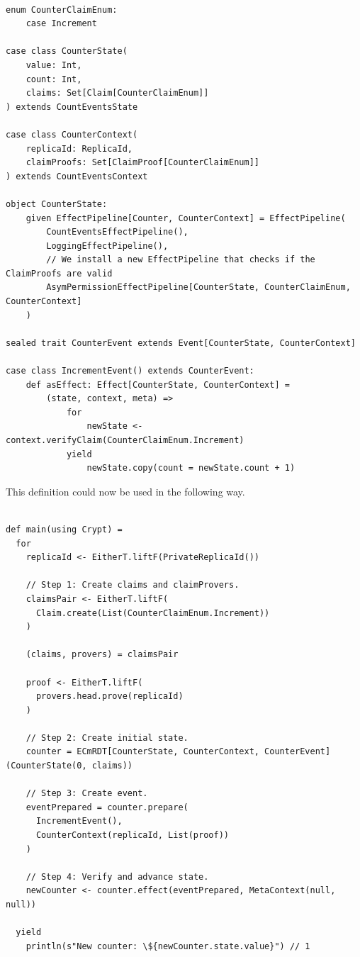 \documentclass[
	ngerman,
	ruledheaders=section,   %
	class=report,		    %
	thesis={type=bachelor}, %
	accentcolor=9c,			%
	custommargins=false,    %
	marginpar=false,        %
	parskip=half-,          %
	fontsize=11pt,          %
]{tudapub}
\begin{document}
\begin{lstlisting}

enum CounterClaimEnum:
	case Increment

case class CounterState(
	value: Int,
	count: Int,
	claims: Set[Claim[CounterClaimEnum]]
) extends CountEventsState

case class CounterContext(
	replicaId: ReplicaId,
	claimProofs: Set[ClaimProof[CounterClaimEnum]]
) extends CountEventsContext

object CounterState:
	given EffectPipeline[Counter, CounterContext] = EffectPipeline(
		CountEventsEffectPipeline(),
		LoggingEffectPipeline(),
		// We install a new EffectPipeline that checks if the ClaimProofs are valid
		AsymPermissionEffectPipeline[CounterState, CounterClaimEnum, CounterContext]
	)

sealed trait CounterEvent extends Event[CounterState, CounterContext]

case class IncrementEvent() extends CounterEvent:
	def asEffect: Effect[CounterState, CounterContext] =
		(state, context, meta) =>
			for
				newState <- context.verifyClaim(CounterClaimEnum.Increment)
			yield
				newState.copy(count = newState.count + 1)

\end{lstlisting}

\newpage

This definition could now be used in the following way.

\begin{lstlisting}

def main(using Crypt) = 
  for
    replicaId <- EitherT.liftF(PrivateReplicaId())

    // Step 1: Create claims and claimProvers.
    claimsPair <- EitherT.liftF(
      Claim.create(List(CounterClaimEnum.Increment))
    )

    (claims, provers) = claimsPair

    proof <- EitherT.liftF(
      provers.head.prove(replicaId)
    )

    // Step 2: Create initial state.
    counter = ECmRDT[CounterState, CounterContext, CounterEvent](CounterState(0, claims))

    // Step 3: Create event.
    eventPrepared = counter.prepare(
      IncrementEvent(),
      CounterContext(replicaId, List(proof))
    )

    // Step 4: Verify and advance state.
    newCounter <- counter.effect(eventPrepared, MetaContext(null, null))

  yield
    println(s"New counter: \${newCounter.state.value}") // 1

\end{lstlisting}
\end{document}
